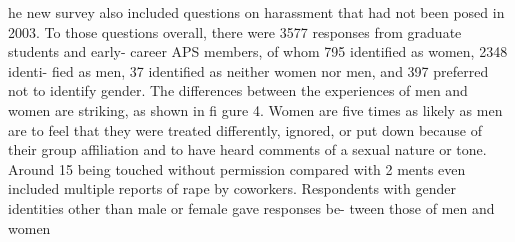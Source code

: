 he new survey also included questions on harassment that
had not been posed in 2003. To those questions overall, there
were 3577 responses from graduate students and early- career
APS members, of whom 795 identified as women, 2348 identi-
fied as men, 37 identified as neither women nor
men, and 397 preferred not to identify gender.
The differences between the experiences of men
and women are striking, as shown in fi gure 4.
Women are five times as likely as men are to feel
that they were treated differently, ignored, or put
down because of their group affiliation and to
have heard comments of a sexual nature or tone.
Around 15%
being touched without permission compared
with 2%
ments even included multiple reports of rape by
coworkers. Respondents with gender identities
other than male or female gave responses be-
tween those of men and women

